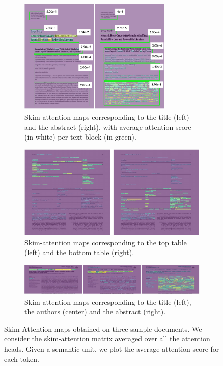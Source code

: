 \begin{figure}[H]
  \centering
    \begin{subfigure}{0.49\textwidth}
      \centering
      \includegraphics[width=0.8\textwidth]{images/chapter3/attention-maps_with-average.pdf}
      \caption{Skim-attention maps corresponding to the title (left) and the abstract (right), with average attention score (in white) per text block (in green).}
    \end{subfigure}
    \begin{subfigure}{0.49\textwidth}
      \centering
      \includegraphics[width=\textwidth]{images/chapter3/vis2-cropped.pdf}
      \caption{Skim-attention maps corresponding to the top table (left) and the bottom table (right).}
    \end{subfigure}
    \begin{subfigure}{\textwidth}
      \centering
      \includegraphics[width=\textwidth]{images/chapter3/vis3.pdf}
      \caption{Skim-attention maps corresponding to the title (left), the authors (center) and the abstract (right).}
    \end{subfigure}
    \caption{Skim-Attention maps obtained on three sample documents. We consider the skim-attention matrix averaged over all the attention heads. Given a semantic unit, we plot the average attention score for each token.}
    \label{fig:attention-vis}
\end{figure}

